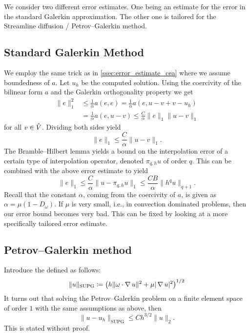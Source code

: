 We consider two different error estimates. One being an estimate for the error
in the standard Galerkin approximation. The other one is tailored for the
Streamline diffusion / Petrov--Galerkin method.

\subsection{Standard Galerkin Method}

We employ the same trick as in \vref{ssec:error_estimate_cea} where we assume
boundedness of \(a\). Let \( u_h \) be the computed solution. Using the
coercivity of the bilinear form \( a \) and the Galerkin orthogonality property
we get
\begin{align}
    \|e\|_1^2 &\leq \frac{1}{\alpha} a(e, e) = \frac{1}{\alpha} a(e, u - v + v - u_h)\\
              &= \frac{1}{\alpha}a(e, u - v) \leq \frac{C}{\alpha}\| e\|_1 \| u - v \|_1
\end{align}
for all \( v \in \hat{V} \).
Dividing both sides yield
\begin{equation}
    \| e \|_1 \leq \frac{C}{\alpha}\| u - v \|_1.
\end{equation}
The Bramble--Hilbert lemma yields a bound on the interpolation error of a
certain type of interpolation operator, denoted \( \pi_{q, h} u \) of order \(
q \). This can be combined with the above error estimate to yield
\begin{equation}
    \| e \|_1 \leq \frac{C}{\alpha}\| u - \pi_{q, h} u \|_1 \leq \frac{CB}{\alpha} \| h^q u \|_{q+1}.
\end{equation}
Recall that the constant \( \alpha \), coming from the coercivity of \(a \), is
given as \( \alpha = \mu ( 1 - D_\omega) \). If \( \mu \) is very small, i.e.,
in convection dominated problems,  then our error bound becomes very bad. This
can be fixed by looking at a more specifically tailored error estimate.

\subsection{Petrov--Galerkin method}

Introduce the  defined as follows:
\begin{equation}
    \| u \|_{\mathrm{SUPG}} \coloneqq \left(h \| \omega \cdot \operatorname{\mathop{}\!\nabla} u \|^2 + \mu | \operatorname{\mathop{}\!\nabla} u |^2 \right)^{1 / 2}
\end{equation}
It turns out that solving the Petrov--Galerkin problem on a finite element
space of order \( 1 \) with the same assumptions as above, then
\begin{equation}
    \| u - u_h\|_{\mathrm{SUPG}} \leq Ch^{3/2} \|u\|_2.
\end{equation}
This is stated without proof.
